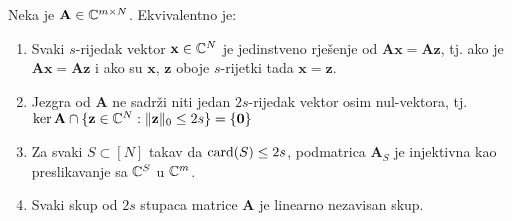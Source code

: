 \documentclass[a4paper,twoside,12pt]{memoir} %
\newcommand{\vect}[1]{\mathbf{#1}}
\newcommand{\card}{\text{\normalfont{card}}}
\newcommand{\norm}[1]{\|{#1}\|}
\begin{document}
\begin{thm}
    Neka je $\vect A \in \C^{m \times N}$. Ekvivalentno je:
    \begin{enumerate}[label=(\alph*)]
        \item Svaki $s$-rijedak vektor $\vect x \in \C^N$ je jedinstveno rje\v{s}enje od $\vect{Ax}=\vect{Az}$, tj. ako je $\vect{Ax}=\vect{Az}$ i ako su $\vect x$, $\vect z$ oboje $s$-rijetki tada $\vect x = \vect z$.
        \item Jezgra od $\vect A$ ne sadr\v{z}i niti jedan $2s$-rijedak vektor osim nul-vektora, tj. $\ker \vect A \cap \{\vect z \in \C^N: \norm{\vect z}_0 \leq 2s\} = \{\vect 0\}$
        \item Za svaki $S \subset [N]$ takav da $\card(S) \leq 2s$, podmatrica $\vect A_S$ je injektivna kao preslikavanje sa $\mathbb{C}^S$ u $\mathbb{C}^m$.
        \item Svaki skup od $2s$ stupaca matrice $\vect A$ je linearno nezavisan skup.
    \end{enumerate}
\end{thm}
\end{document}
